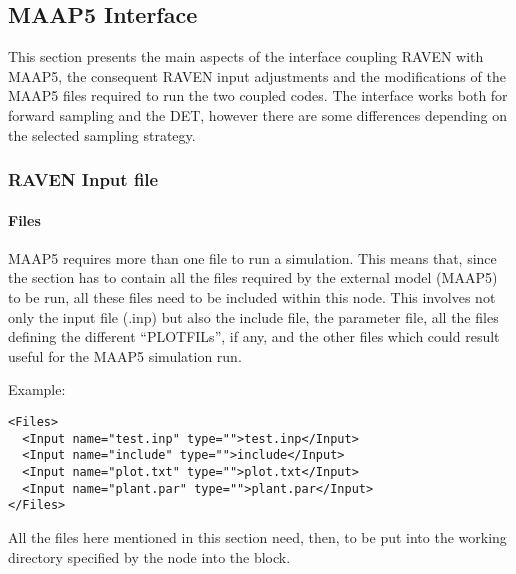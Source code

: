 \subsection{MAAP5 Interface}
This section presents the main aspects of the interface coupling RAVEN with MAAP5,
the consequent RAVEN input adjustments and the modifications of the MAAP5
files required to run the two coupled codes.
The interface works both for forward sampling and the DET,
however there are some differences depending on the selected sampling strategy.
\subsubsection{RAVEN Input file}
\paragraph{Files}
MAAP5 requires more than one file to run a simulation.
This means that, since the  section has to contain all the files required by
the external model (MAAP5) to be run, all these files need to be included within this node.
This involves not only the input file (.inp) but also the include file, the parameter file, all the
files defining the different ``PLOTFILs'', if any, and the other files which could
result useful for the MAAP5 simulation run.

Example:
\begin{lstlisting}[style=XML]
<Files>
  <Input name="test.inp" type="">test.inp</Input>
  <Input name="include" type="">include</Input>
  <Input name="plot.txt" type="">plot.txt</Input>
  <Input name="plant.par" type="">plant.par</Input>
</Files>
\end{lstlisting}
All the files here mentioned in this section
 need, then, to be put into the working directory specified
by the  node into the  block.

